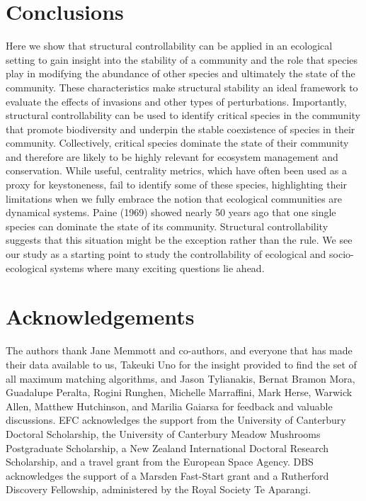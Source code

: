 \documentclass[a4paper]{artikel1}
\theoremstyle{definition}
\theoremstyle{definition}
\theoremstyle{definition}
\theoremstyle{remark}
\begin{document}
\section{Conclusions}\label{conclusions}

Here we show that structural controllability can be applied in an
ecological setting to gain insight into the stability of a community and
the role that species play in modifying the abundance of other species
and ultimately the state of the community. These characteristics make
structural stability an ideal framework to evaluate the effects of
invasions and other types of perturbations. Importantly, structural
controllability can be used to identify critical species in the
community that promote biodiversity and underpin the stable coexistence
of species in their community. Collectively, critical species dominate
the state of their community and therefore are likely to be highly
relevant for ecosystem management and conservation. While useful,
centrality metrics, which have often been used as a proxy for
keystoneness, fail to identify some of these species, highlighting their
limitations when we fully embrace the notion that ecological communities
are dynamical systems. Paine (1969) showed nearly 50 years ago that one
single species can dominate the state of its community. Structural
controllability suggests that this situation might be the exception
rather than the rule. We see our study as a starting point to study the
controllability of ecological and socio-ecological systems where many
exciting questions lie ahead.

\section{Acknowledgements}\label{acknowledgements}

The authors thank Jane Memmott and co-authors, and everyone that has
made their data available to us, Takeuki Uno for the insight provided to
find the set of all maximum matching algorithms, and Jason Tylianakis,
Bernat Bramon Mora, Guadalupe Peralta, Rogini Runghen, Michelle
Marraffini, Mark Herse, Warwick Allen, Matthew Hutchinson, and Marilia
Gaiarsa for feedback and valuable discussions. EFC acknowledges the
support from the University of Canterbury Doctoral Scholarship, the
University of Canterbury Meadow Mushrooms Postgraduate Scholarship, a
New Zealand International Doctoral Research Scholarship, and a travel
grant from the European Space Agency. DBS acknowledges the support of a
Marsden Fast-Start grant and a Rutherford Discovery Fellowship,
administered by the Royal Society Te Aparangi.
\end{document}
